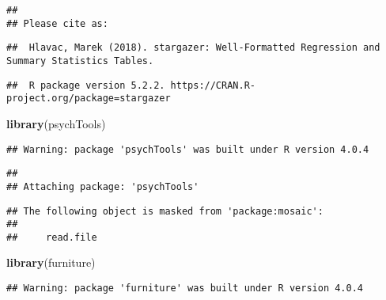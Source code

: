 \documentclass[
]{article}
\newenvironment{Shaded}{\begin{snugshade}}{\end{snugshade}}
\newcommand{\KeywordTok}[1]{\textcolor[rgb]{0.13,0.29,0.53}{\textbf{#1}}}
\newcommand{\NormalTok}[1]{#1}
\begin{document}
\begin{verbatim}
## 
## Please cite as:
\end{verbatim}

\begin{verbatim}
##  Hlavac, Marek (2018). stargazer: Well-Formatted Regression and Summary Statistics Tables.
\end{verbatim}

\begin{verbatim}
##  R package version 5.2.2. https://CRAN.R-project.org/package=stargazer
\end{verbatim}

\begin{Shaded}
\begin{Highlighting}[]
\KeywordTok{library}\NormalTok{(psychTools)}
\end{Highlighting}
\end{Shaded}

\begin{verbatim}
## Warning: package 'psychTools' was built under R version 4.0.4
\end{verbatim}

\begin{verbatim}
## 
## Attaching package: 'psychTools'
\end{verbatim}

\begin{verbatim}
## The following object is masked from 'package:mosaic':
## 
##     read.file
\end{verbatim}

\begin{Shaded}
\begin{Highlighting}[]
\KeywordTok{library}\NormalTok{(furniture)}
\end{Highlighting}
\end{Shaded}

\begin{verbatim}
## Warning: package 'furniture' was built under R version 4.0.4
\end{verbatim}
\end{document}
